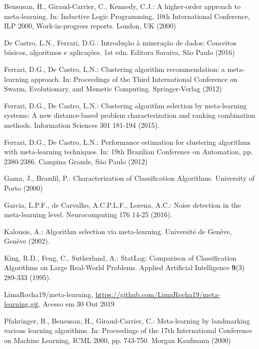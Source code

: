 \documentclass[runningheads]{llncs}
\begin{document}
\begin{thebibliography}{8}

Bensusan, H., Giraud-Carrier, C., Kennedy, C.J.: A higher-order approach to meta-learning. In: Inductive Logic Programming, 10th International Conference, ILP 2000, Work-in-progress reports. London, UK (2000)

De Castro, L.N., Ferrari, D.G.: Introdução à mineração de dados: Conceitos básicos, algoritmos e aplicações. 1st edn. Editora Saraiva, São Paulo (2016)

Ferrari, D.G., De Castro, L.N.: Clustering algorithm recommendation: a meta-learning approach. In: Proceedings of the Third International Conference on Swarm, Evolutionary, and Memetic Computing. Springer-Verlag (2012)

Ferrari, D.G., De Castro, L.N.: Clustering algorithm selection by meta-learning systems: A new distance-based problem characterization and ranking combination methods. Information Sciences 301 181-194 (2015). 

Ferrari, D.G., De Castro, L.N.: Performance estimation for clustering algorithms with meta-learning techniques. In: 19th Brazilian Conference on Automation, pp. 2380-2386. Campina Grande, São Paulo (2012)

Gama, J., Brazdil, P.: Characterization of Classification Algorithms. University of Porto (2000)

Garcia, L.P.F., de Carvalho, A.C.P.L.F., Lorena, A.C.: Noise detection in the meta-learning level. Neurocomputing 176 14-25 (2016). 

Kalousis, A.: Algorithm selection via meta-learning. Université de Genève, Genève (2002). 

King, R.D., Feng, C., Sutherland, A.: StatLog: Comparison of Classification Algorithms on Large Real-World Problems. Applied Artificial Intelligence \textbf{9}(3) 289-333 (1995). 

LimaRocha19/meta-learning, \url{https://github.com/LimaRocha19/meta-learning.git}. Acesso em 30 Out 2019

Pfahringer, B., Bensusan, H., Giraud-Carrier, C.: Meta-learning by landmarking various learning algorithms. In: Proceedings of the 17th International Conference on Machine Learning, ICML 2000, pp. 743-750. Morgan Kaufmann (2000)


\end{thebibliography}
\end{document}
